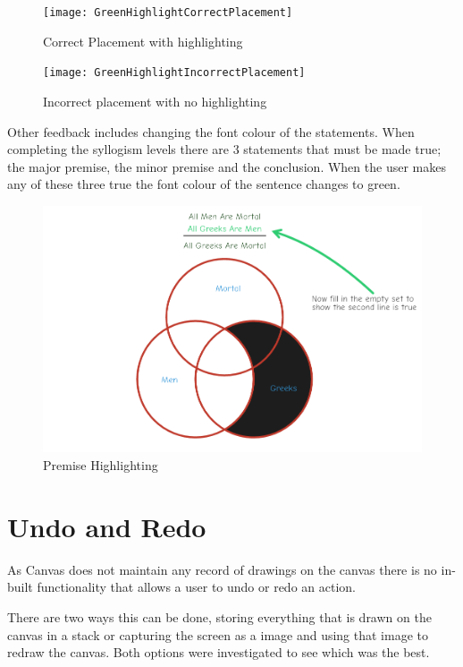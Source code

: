 \documentclass[12pt,a4paper]{report}
\begin{document}
\begin{figure}[!h]
  \centering
  \begin{minipage}[b]{0.4\textwidth}
    \texttt{[image: GreenHighlightCorrectPlacement]}
    \caption{Correct Placement with highlighting}
  \end{minipage}
  \hfill
  \begin{minipage}[b]{0.4\textwidth}
    \texttt{[image: GreenHighlightIncorrectPlacement]}
    \caption{Incorrect placement with no highlighting}
  \end{minipage}
\end{figure}
\FloatBarrier

Other feedback includes changing the font colour of the statements. When completing the syllogism levels there are 3 statements that must be made true; the major premise, the minor premise and the conclusion. When the user makes any of these three true the font colour of the sentence changes to green.


\begin{figure}[h]
\centering
    \includegraphics[scale=0.4]{PremiseHighlight}
    \caption{Premise Highlighting}
    \label{fig:premiseHighlight}
\end{figure}
\FloatBarrier



\section{Undo and Redo}
As Canvas does not maintain any record of drawings on the canvas there is no in-built functionality that allows a user to undo or redo an action. 

There are two ways this can be done, storing everything that is drawn on the canvas in a stack or capturing the screen as a image and using that image to redraw the canvas. Both options were investigated to see which was the best.
\end{document}
